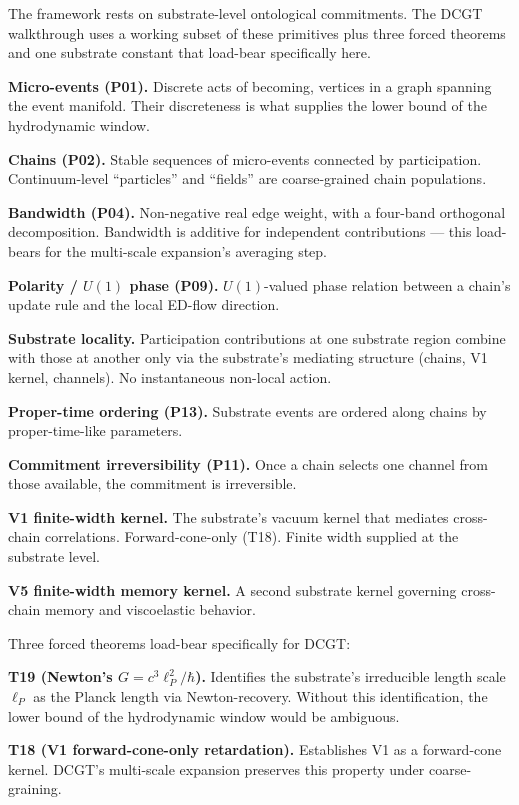 \documentclass[11pt,a4paper]{article}
\begin{document}
The framework rests on substrate-level ontological commitments. The DCGT walkthrough uses a working subset of these primitives plus three forced theorems and one substrate constant that load-bear specifically here.

\textbf{Micro-events (P01).} Discrete acts of becoming, vertices in a graph spanning the event manifold. Their discreteness is what supplies the lower bound of the hydrodynamic window.

\textbf{Chains (P02).} Stable sequences of micro-events connected by participation. Continuum-level ``particles'' and ``fields'' are coarse-grained chain populations.

\textbf{Bandwidth (P04).} Non-negative real edge weight, with a four-band orthogonal decomposition. Bandwidth is additive for independent contributions --- this load-bears for the multi-scale expansion's averaging step.

\textbf{Polarity / $U(1)$ phase (P09).} $U(1)$-valued phase relation between a chain's update rule and the local ED-flow direction.

\textbf{Substrate locality.} Participation contributions at one substrate region combine with those at another only via the substrate's mediating structure (chains, V1 kernel, channels). No instantaneous non-local action.

\textbf{Proper-time ordering (P13).} Substrate events are ordered along chains by proper-time-like parameters.

\textbf{Commitment irreversibility (P11).} Once a chain selects one channel from those available, the commitment is irreversible.

\textbf{V1 finite-width kernel.} The substrate's vacuum kernel that mediates cross-chain correlations. Forward-cone-only (T18). Finite width supplied at the substrate level.

\textbf{V5 finite-width memory kernel.} A second substrate kernel governing cross-chain memory and viscoelastic behavior.

Three forced theorems load-bear specifically for DCGT:

\textbf{T19 (Newton's $G = c^3 \ell_P^2 / \hbar$).} Identifies the substrate's irreducible length scale $\ell_P$ as the Planck length via Newton-recovery. Without this identification, the lower bound of the hydrodynamic window would be ambiguous.

\textbf{T18 (V1 forward-cone-only retardation).} Establishes V1 as a forward-cone kernel. DCGT's multi-scale expansion preserves this property under coarse-graining.
\end{document}
